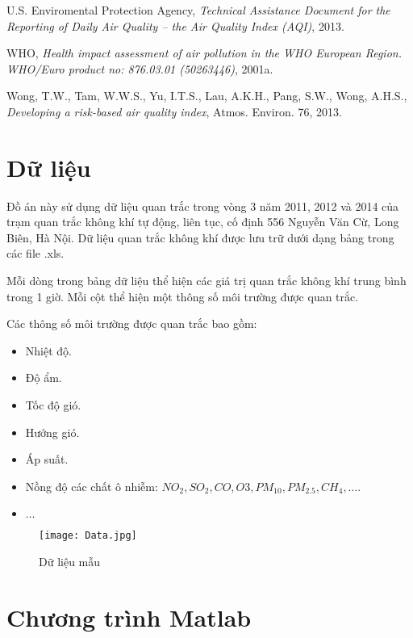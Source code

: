 \documentclass[14pt]{extreport}
\theoremstyle{definition}
\theoremstyle{plain}
\theoremstyle{remark}
\begin{document}
\begin{thebibliography}{9}
	U.S. Enviromental Protection Agency,
	\emph{Technical Assistance Document for the Reporting of Daily Air Quality – the Air Quality Index (AQI)},
	2013.

	WHO,
	\emph{Health impact assessment of air pollution in the WHO European Region. WHO/Euro product no: 876.03.01 (50263446)},
	2001a.	
	
	Wong, T.W., Tam, W.W.S., Yu, I.T.S., Lau, A.K.H., Pang, S.W., Wong, A.H.S.,
	\emph{Developing a risk-based air quality index},
	Atmos. Environ. 76,
	2013.
	
\end{thebibliography}


\newpage 
\begin{appendices}
\chapter{Dữ liệu}
Đồ án này sử dụng dữ liệu quan trắc trong vòng 3 năm 2011, 2012 và 2014 của trạm quan trắc không khí tự động, liên tục, cố định 556 Nguyễn Văn Cừ, Long Biên, Hà Nội. Dữ liệu quan trắc không khí được lưu trữ dưới dạng bảng trong các file .xls.

Mỗi dòng trong bảng dữ liệu thể hiện các giá trị quan trắc không khí trung bình trong 1 giờ. Mỗi cột thể hiện một thông số môi trường được quan trắc. 

Các thông số môi trường được quan trắc bao gồm:
\begin{itemize}
\item Nhiệt độ.
\item Độ ẩm.
\item Tốc độ gió.
\item Hướng gió.
\item Áp suất.
\item Nồng độ các chất ô nhiễm: $NO_2, SO_2, CO, O3, PM_{10}, PM_{2.5}, CH_4,\ldots$.
\item $\ldots$
\end{itemize}

\begin{figure}
\begin{center}
\texttt{[image: Data.jpg]}
\caption{Dữ liệu mẫu}
\end{center}
\end{figure}

\chapter{Chương trình Matlab}

\end{appendices}
\end{document}
